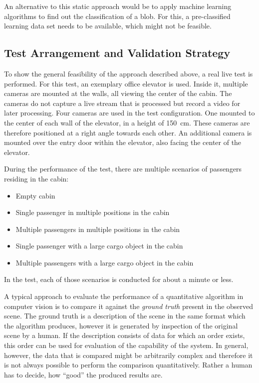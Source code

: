 An alternative to this static approach would be to apply machine learning algorithms to find out the classification of a blob.
For this, a pre-classified learning data set needs to be available, which might not be feasible.

\subsection{Test Arrangement and Validation Strategy}
\label{sec:design:visualtest}
To show the general feasibility of the approach described above, 
a real live test is performed.
For this test, an exemplary office elevator is used.
Inside it, multiple cameras are mounted at the walls, 
all viewing the center of the cabin.
The cameras do not capture a live stream that is processed but record a video for later processing.
Four cameras are used in the test configuration.
One mounted to the center of each wall of the elevator, in a height of 150~cm.
These cameras are therefore positioned at a right angle towards each other.
An additional camera is mounted over the entry door within the elevator, also facing the center of the elevator.

During the performance of the test, there are multiple scenarios
of passengers residing in the cabin:
\begin{itemize}
    \item Empty cabin
    \item Single passenger in multiple positions in the cabin
    \item Multiple passengers in multiple positions in the cabin
    \item Single passenger with a large cargo object in the cabin
    \item Multiple passengers with a large cargo object in the cabin
\end{itemize}
In the test, each of those scenarios is conducted for about a minute or less.

A typical approach to evaluate the performance of a 
quantitative algorithm in computer vision is to compare it against the \emph{ground truth} present in the observed scene.
The ground truth is a description of the scene in the same format which the algorithm produces, however it is generated by inspection of the original scene by a human.
If the description consists of data for which an order exists, this order can be used for evaluation of the capability of the system.
In general, however, the data that is compared might be arbitrarily complex and therefore it is not always possible to perform the comparison quantitatively. Rather a human has to decide, how \enquote{good} the produced results are.


